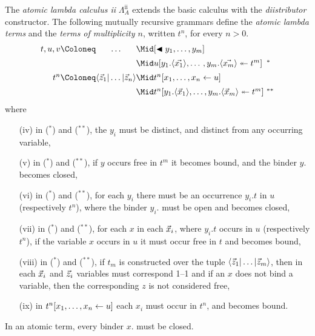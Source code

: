 \documentclass{amsart}
\begin{document}
\begin{definition}
\label{def:atomic calculus}
The \emph{atomic lambda calculus ii} $\Lambda_A^{\mathrm{ii}}$ extends the basic calculus with the \emph{diistributor} constructor.
%
The following mutually recursive grammars define the \emph{atomic lambda terms} and the \emph{terms of multiplicity $n$}, written $t^n$, for every $n>0$. 
%
\setMidspace{10pt}
%
\[
\begin{array}{@{}r@{}c@{}l@{~}l@{}}
        t,u,v \Coloneq & \ldots  & \Mid \unshare[m]y
\\[5pt]                 && \Mid u\diistr[m] xy{t^m} & ^*
\\[5pt]		t^n   \Coloneq & \ttup*z & \Mid t^n\share xu
\\[5pt]							   && \Mid t^n\diistr*{y_1.\tup*{\vv*x_1},\ldots,y_m.\tup*{\vv*x_m}}y{t^m}	 & ^{**}
\end{array}
\]
%
where 
\begin{itemize}
	\item[(iv)] in ($^*$) and ($^{**}$), the $y_i$ must be distinct, and distinct from any occurring variable,
	\item[(v)]  in ($^*$) and ($^{**}$), if $y$ occurs free in $t^m$ it becomes bound, and the binder $y.$ becomes closed,
	\item[(vi)] in ($^*$) and ($^{**}$), for each $y_i$ there must be an occurrence $y_i.t$ in $u$ (respectively $t^n$), where the binder $y_i.$ must be open and becomes closed,
	\item[(vii)] in ($^*$) and ($^{**}$), for each $x$ in each $\vv*x_i$,
                where $y_i.t$ occurs in $u$ (respectively $t^n$), if the
                variable $x$ occurs in $u$ it must occur free in $t$ and becomes bound,
	\item[(viii)] in ($^*$) and ($^{**}$), if $t_m$ is constructed over the
                tuple $\ttup*[m]z$, then in each $\vv*x_i$ and $\vv*z_i$
                variables must correspond 1--1 and if an $x$ does not bind a
                variable, then the corresponding $z$ is not considered free,
	\item[(ix)] in $t^n\share xu$ each $x_i$ must occur in $t^n$, and becomes bound.
\end{itemize}
%
In an atomic term, every binder $x.$ must be closed.
%
\end{definition}

\end{document}
